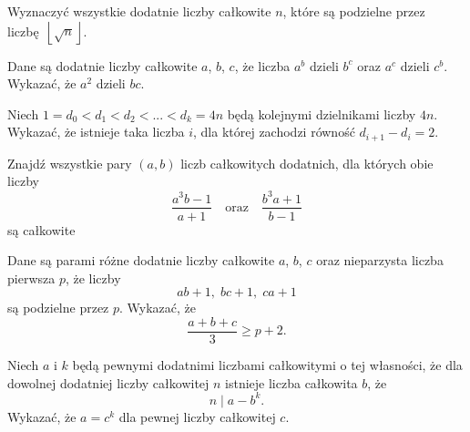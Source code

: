 \begin{problem}{1}
	Wyznaczyć wszystkie dodatnie liczby całkowite $n$, które są podzielne przez liczbę~$\left\lfloor \sqrt{n} \right\rfloor$.
\end{problem}

\begin{problem}{2}
	Dane są dodatnie liczby całkowite $a$, $b$, $c$, że liczba $a^b$ dzieli $b^c$ oraz $a^c$ dzieli $c^b$. Wykazać, że $a^2$ dzieli $bc$.
\end{problem}

\begin{problem}{3}
	Niech $1 = d_0 < d_1 < d_2 < ... < d_k = 4n$ będą kolejnymi dzielnikami liczby $4n$. Wykazać, że istnieje taka liczba $i$, dla której zachodzi równość $d_{i + 1} - d_i = 2$.
\end{problem}

\begin{problem}{4}
	Znajdź wszystkie pary $(a, b)$ liczb całkowitych dodatnich, dla których obie liczby
	\[
		\frac{a^3b - 1}{a + 1} \quad \text{oraz} \quad \frac{b^3a + 1}{b - 1}
	\]
	są całkowite
\end{problem}

\begin{problem}{5}
	Dane są parami różne dodatnie liczby całkowite $a$, $b$, $c$ oraz nieparzysta liczba pierwsza $p$, że liczby
	\[
		ab + 1, \; bc + 1, \; ca + 1
	\] 
	są podzielne przez $p$. Wykazać, że
	\[
		\frac{a + b + c}{3} \geqslant p + 2.
	\]
\end{problem}

\begin{problem}{6}
	Niech $a$ i $k$ będą pewnymi dodatnimi liczbami całkowitymi o tej własności, że dla dowolnej dodatniej liczby całkowitej $n$ istnieje liczba całkowita $b$, że
	\[
		n \mid a - b^k.
	\]
	Wykazać, że $a = c^k$ dla pewnej liczby całkowitej $c$.
\end{problem}

